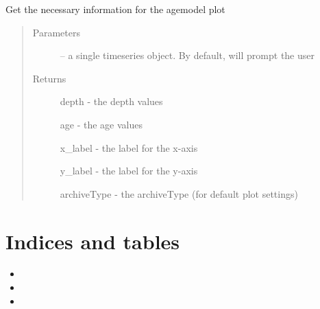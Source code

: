 \documentclass[letterpaper,10pt,english]{sphinxmanual}
\begin{document}
\begin{fulllineitems}
\label{\detokenize{SummaryPlots:pyleoclim.SummaryPlots.agemodelData}}
Get the necessary information for the agemodel plot
\begin{quote}\begin{description}
\item[{Parameters}] \leavevmode
{} -- a single timeseries object. By default, will
prompt the user

\item[{Returns}] \leavevmode

depth - the depth values

age - the age values

x\_label - the label for the x-axis

y\_label - the label for the y-axis

archiveType - the archiveType (for default plot settings)


\end{description}\end{quote}

\end{fulllineitems}



\chapter{Indices and tables}
\label{\detokenize{index:indices-and-tables}}\begin{itemize}
\item {} 

\item {} 

\item {} 

\end{itemize}



\renewcommand{\indexname}{Index}
\printindex
\end{document}
